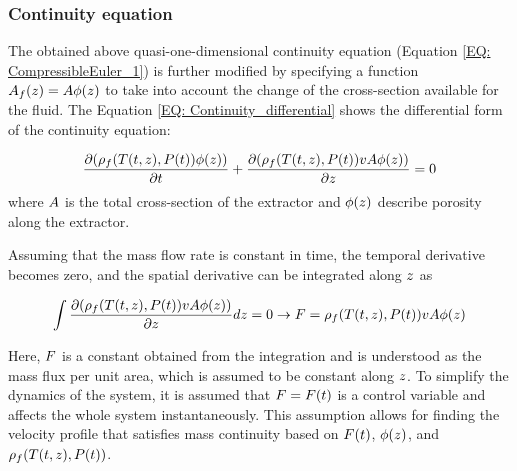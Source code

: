 \documentclass[../Article_Sensitivity_Analsysis.tex]{subfiles}
\begin{document}
		
	\subsubsection{Continuity equation} \label{CH: Continuity}
	The obtained above quasi-one-dimensional continuity equation (Equation \ref{EQ: CompressibleEuler_1}) is further modified by specifying a function ${\color{black}A_f}(z) = {\color{black}A\phi}(z)$ to take into account the change of the cross-section available for the fluid. The Equation \ref{EQ: Continuity_differential} shows the differential form of the continuity equation: 
	
	{\footnotesize
		\begin{equation} \label{EQ: Continuity_differential}
			\frac{\partial ({\color{black}\rho_f}({\color{black}T}(t,z),{\color{black}P}(t)) {\color{black}\phi}(z))}{\partial t} + \frac{\partial ({\color{black}\rho_f}({\color{black}T}(t,z),{\color{black}P}(t)) v {\color{black}A\phi}(z))}{\partial {\color{black}z}} = 0
		\end{equation}
	}
	where ${\color{black} A}$ is the total cross-section of the extractor and ${\color{black}\phi}(z)$ describe porosity along the extractor.
	
	
	Assuming that the mass flow rate is constant in time, the temporal derivative becomes zero, and the spatial derivative can be integrated along ${\color{black}z}$ as
	
	{\footnotesize
		\begin{equation} \label{EQ:Velocity}
			\int \frac{\partial ({\color{black}\rho_f}({\color{black}T}(t,z),{\color{black}P}(t)) v {\color{black}A \phi}(z) )}{\partial {\color{black}z}} dz = 0 \rightarrow {\color{black}F}={\color{black}\rho_f}({\color{black}T}(t,z),{\color{black}P}(t)) v {\color{black}A\phi}(z)
		\end{equation}
	}
	
	Here, ${\color{black}F}$ is a constant obtained from the integration and is understood as the mass flux per unit area, which is assumed to be constant along ${\color{black}z}$. To simplify the dynamics of the system, it is assumed that ${\color{black}F}={\color{black}F}(t)$ is a control variable and affects the whole system instantaneously. This assumption allows for finding the velocity profile that satisfies mass continuity based on ${\color{black}F}(t)$, ${\color{black}\phi}(z)$, and ${\color{black}\rho_f}({\color{black}T}(t,z),{\color{black}P}(t))$.
	
\end{document}
